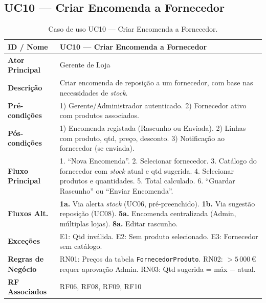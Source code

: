 \documentclass[a4paper,12pt]{scrreprt}
\begin{document}
\subsection*{UC10 --- Criar Encomenda a Fornecedor}
\begin{table}[H]
\centering\small
\begin{tabular}{|p{3cm}|p{11cm}|}
\hline
\textbf{ID / Nome} & UC10 --- Criar Encomenda a Fornecedor \\
\hline
\textbf{Ator Principal} & Gerente de Loja \\
\hline
\textbf{Descrição} & Criar encomenda de reposição a um fornecedor, com base nas necessidades de \textit{stock}. \\
\hline
\textbf{Pré-condições} & 1) Gerente/Administrador autenticado. 2) Fornecedor ativo com produtos associados. \\
\hline
\textbf{Pós-condições} & 1) Encomenda registada (Rascunho ou Enviada). 2) Linhas com produto, qtd, preço, desconto. 3) Notificação ao fornecedor (se enviada). \\
\hline
\textbf{Fluxo Principal} & 1. ``Nova Encomenda''. 2. Selecionar fornecedor. 3. Catálogo do fornecedor com \textit{stock} atual e qtd sugerida. 4. Selecionar produtos e quantidades. 5. Total calculado. 6. ``Guardar Rascunho'' ou ``Enviar Encomenda''. \\
\hline
\textbf{Fluxos Alt.} & \textbf{1a.} Via alerta \textit{stock} (UC06, pré-preenchido). \textbf{1b.} Via sugestão reposição (UC08). \textbf{5a.} Encomenda centralizada (Admin, múltiplas lojas). \textbf{8a.} Editar rascunho. \\
\hline
\textbf{Exceções} & E1: Qtd inválida. E2: Sem produto selecionado. E3: Fornecedor sem catálogo. \\
\hline
\textbf{Regras de Negócio} & RN01: Preços da tabela \texttt{FornecedorProduto}. RN02: $> 5\,000$\,€ requer aprovação Admin. RN03: Qtd sugerida = máx $-$ atual. \\
\hline
\textbf{RF Associados} & RF06, RF08, RF09, RF10 \\
\hline
\end{tabular}
\caption{Caso de uso UC10 --- Criar Encomenda a Fornecedor.}
\end{table}

\end{document}
